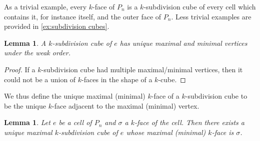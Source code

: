 \documentclass{amsart}
\newtheorem{lemma}[theorem]{Lemma}
\theoremstyle{definition}
\begin{document}
As a trivial example, every $k$-face of $P_n$ is a $k$-subdivision cube of every cell which contains it, for instance itself, and the outer face of $P_n$.
Less trivial examples are provided in \cref{ex:subdivision cubes}.

\begin{lemma}\label{lem:k-subdiv cubes have max/min k faces}
A $k$-subdivision cube of $e$ has unique maximal and minimal vertices under the weak order.
\end{lemma}

\begin{proof}
If a $k$-subdivision cube had multiple maximal/minimal vertices, then it could not be a union of $k$-faces in the shape of a $k$-cube.
\end{proof}

We thus define the unique maximal (minimal) $k$-face of a $k$-subdivision cube to be the unique $k$-face adjacent to the maximal (minimal) vertex.

\begin{lemma}\label{lem:Unique maximal subdivcubes}
Let $e$ be a cell of $P_n$ and $\sigma$ a $k$-face of the cell. Then there exists a unique maximal $k$-subdivision cube of $e$ whose maximal (minimal) $k$-face is $\sigma$.
\end{lemma}
\end{document}
